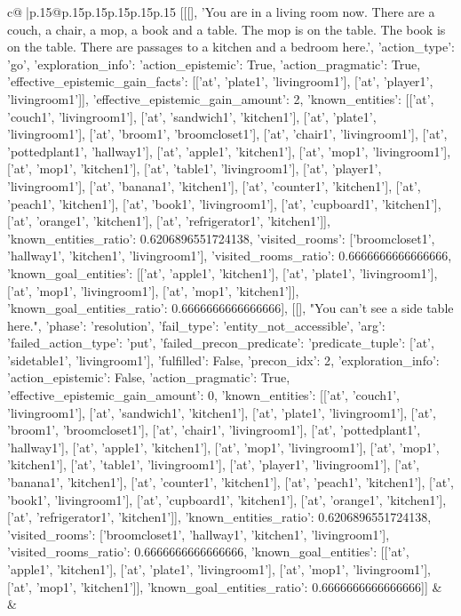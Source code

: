 \documentclass{article}
\begin{document}
{\begin{supertabular}{c@{$\;$}|p{.15\linewidth}@{}p{.15\linewidth}p{.15\linewidth}p{.15\linewidth}p{.15\linewidth}p{.15\linewidth}}
{{{	 [[[], 'You are in a living room now. There are a couch, a chair, a mop, a book and a table. The mop is on the table. The book is on the table. There are passages to a kitchen and a bedroom here.', {'action_type': 'go', 'exploration_info': {'action_epistemic': True, 'action_pragmatic': True, 'effective_epistemic_gain_facts': [['at', 'plate1', 'livingroom1'], ['at', 'player1', 'livingroom1']], 'effective_epistemic_gain_amount': 2, 'known_entities': [['at', 'couch1', 'livingroom1'], ['at', 'sandwich1', 'kitchen1'], ['at', 'plate1', 'livingroom1'], ['at', 'broom1', 'broomcloset1'], ['at', 'chair1', 'livingroom1'], ['at', 'pottedplant1', 'hallway1'], ['at', 'apple1', 'kitchen1'], ['at', 'mop1', 'livingroom1'], ['at', 'mop1', 'kitchen1'], ['at', 'table1', 'livingroom1'], ['at', 'player1', 'livingroom1'], ['at', 'banana1', 'kitchen1'], ['at', 'counter1', 'kitchen1'], ['at', 'peach1', 'kitchen1'], ['at', 'book1', 'livingroom1'], ['at', 'cupboard1', 'kitchen1'], ['at', 'orange1', 'kitchen1'], ['at', 'refrigerator1', 'kitchen1']], 'known_entities_ratio': 0.6206896551724138, 'visited_rooms': ['broomcloset1', 'hallway1', 'kitchen1', 'livingroom1'], 'visited_rooms_ratio': 0.6666666666666666, 'known_goal_entities': [['at', 'apple1', 'kitchen1'], ['at', 'plate1', 'livingroom1'], ['at', 'mop1', 'livingroom1'], ['at', 'mop1', 'kitchen1']], 'known_goal_entities_ratio': 0.6666666666666666}}], [[], "You can't see a side table here.", {'phase': 'resolution', 'fail_type': 'entity_not_accessible', 'arg': {'failed_action_type': 'put', 'failed_precon_predicate': {'predicate_tuple': ['at', 'sidetable1', 'livingroom1'], 'fulfilled': False, 'precon_idx': 2}}, 'exploration_info': {'action_epistemic': False, 'action_pragmatic': True, 'effective_epistemic_gain_amount': 0, 'known_entities': [['at', 'couch1', 'livingroom1'], ['at', 'sandwich1', 'kitchen1'], ['at', 'plate1', 'livingroom1'], ['at', 'broom1', 'broomcloset1'], ['at', 'chair1', 'livingroom1'], ['at', 'pottedplant1', 'hallway1'], ['at', 'apple1', 'kitchen1'], ['at', 'mop1', 'livingroom1'], ['at', 'mop1', 'kitchen1'], ['at', 'table1', 'livingroom1'], ['at', 'player1', 'livingroom1'], ['at', 'banana1', 'kitchen1'], ['at', 'counter1', 'kitchen1'], ['at', 'peach1', 'kitchen1'], ['at', 'book1', 'livingroom1'], ['at', 'cupboard1', 'kitchen1'], ['at', 'orange1', 'kitchen1'], ['at', 'refrigerator1', 'kitchen1']], 'known_entities_ratio': 0.6206896551724138, 'visited_rooms': ['broomcloset1', 'hallway1', 'kitchen1', 'livingroom1'], 'visited_rooms_ratio': 0.6666666666666666, 'known_goal_entities': [['at', 'apple1', 'kitchen1'], ['at', 'plate1', 'livingroom1'], ['at', 'mop1', 'livingroom1'], ['at', 'mop1', 'kitchen1']], 'known_goal_entities_ratio': 0.6666666666666666}}]] 
	  } 
	   } 
	   } 
	 & & \\ 
 


\end{supertabular}}
\end{document}

